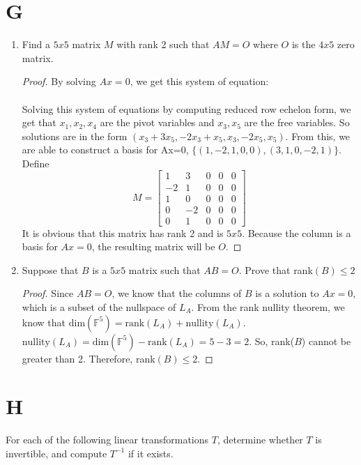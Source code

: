 \documentclass[11pt]{scrartcl}
\begin{document}
\section{G}

\begin{enumerate}[label=\alph*.]
	\item{
		Find a $5x5$ matrix $M$ with rank 2 such that $AM=O$ where $O$ is the $4x5$ zero matrix.
		\begin{proof}
			By solving $Ax=0$, we get this system of equation:\\
			\\
			Solving this system of equations by computing reduced row echelon form, 
			we get that $x_1, x_2, x_4$ are the pivot variables and $x_3, x_5$ are the 
			free variables. So solutions are in the form 
			$(x_3+3x_5,-2x_3+x_5, x_3, -2x_5,x_5)$. From this, we are able to 
			construct a basis for Ax=0, $\{(1,-2,1,0,0),(3,1,0,-2,1)\}$.
			Define   
			\[			
				M=
				\left[\begin{array}{ccccc}
				1 &3 & 0 & 0 &0 \\ 
				-2 &1 & 0 & 0 &0 \\ 
				1 &0 & 0 & 0 &0 \\ 
				0 &-2 & 0 & 0 &0 \\ 
				0 &1 & 0 & 0 &0 
				\end{array}\right]	
			\]
			It is obvious that this matrix has rank 2 and is $5x5$. Because the column is a basis for $Ax=0$, the resulting matrix will be $O$.
		\end{proof}
	}
	\item{
		Suppose that $B$ is a $5x5$ matrix such that $AB=O$. Prove that rank$(B) \leq 2$
		\begin{proof}
			Since $AB=O$, we know that the columns of $B$ is a solution to $Ax=0$, which is a subset of the nullspace of $L_A$.
			From the rank nullity theorem, we know that $\text{dim}(\mathbb{F}^5) = \text{rank}(L_A) + \text{nullity}(L_A)$.\\
			$\text{nullity}(L_A) = \text{dim}(\mathbb{F}^5) - \text{rank}(L_A) = 5 - 3 = 2$. So, rank($B$) cannot be greater than 2. 
			Therefore, rank$(B) \leq 2$.
		\end{proof}
	}
\end{enumerate}

\section{H} 
For each of the following linear transformations $T$, determine whether $T$ is invertible, and compute $T^{-1}$ if it exists.
\end{document}
